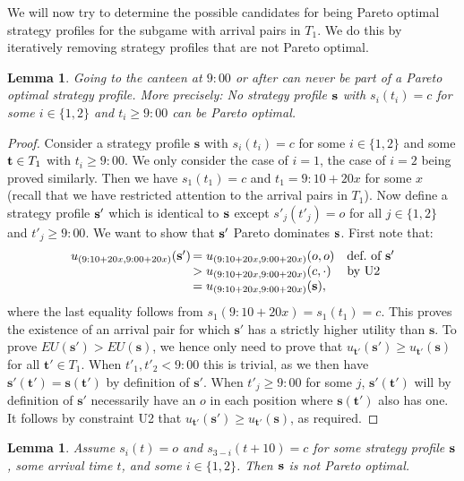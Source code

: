 \documentclass[twocolumn,a4paper,superscriptaddress,nofootinbib]{revtex4}
\newtheorem{lemma}[theorem]{Lemma}
\begin{document}
We will now try to determine the possible candidates for being Pareto optimal strategy profiles for the subgame with arrival pairs in $T_1$. We do this by iteratively removing strategy profiles that are not Pareto optimal.
\begin{lemma}\label{lemma:no-canteen-at-nine}
Going to the canteen at $9{:}00$ or after can never be part of a Pareto optimal strategy profile. More precisely: No strategy profile $\bf s$ with $s_i(t_i) = c$ for some $i \in \{1,2\}$ and
$t_i \geq 9{:}00$  can be Pareto optimal.
\end{lemma}
\begin{proof}
Consider a strategy profile $\mathbf{s}$ with $s_{i}(t_{i}) = c$ for some $i\in \{1,2\}$ and
some ${\bf t} \in T_1$ with $t_{i} \geq 9{:}00$. We only consider the case of $i=1$, the case of $i=2$ being proved similarly. Then we have $s_1(t_1) =c$ and $t_1 = 9{:}10+20x$ for some $x$ (recall that we have restricted attention to the arrival pairs in $T_1$). Now define a strategy profile ${\bf s}'$ which is identical to ${\bf s}$ except $s'_j(t'_j) = o$ for all $j \in \{1,2\}$ and $t'_j \geq 9{:}00$. We want to show that ${\bf s}'$ Pareto dominates ${\bf s}$. First note that:
\[
  \begin{array}{rll}
   u_{(9{:}10+20x,9{:}00+20x)}({\bf s}') \!\!\!\!\!{ } &= u_{(9{:}10+20x,9{:}00+20x)}(o,o) &\text{def.\ of $\mathbf{s'}$} \\
   	&> u_{(9{:}10+20x,9{:}00+20x)}(c,\cdot) &\text{by U2} \\
	&= u_{(9{:}10+20x,9{:}00+20x)}({\bf s}), \\ 
  \end{array}
\]
where the last equality follows from $s_1(9{:}10+20x) = s_1(t_1) =  c$. This proves the existence of an arrival pair for which $\mathbf{s'}$ has a strictly higher utility than $\mathbf{s}$. To prove $EU(\mathbf{s'}) > EU(\mathbf{s})$, we hence only need to prove that $u_\mathbf{t'}(\mathbf{s'}) \geq u_\mathbf{t'}(\mathbf{s})$ for all $\mathbf{t'} \in T_1$. When $t'_1,t'_2 < 9{:}00$ this is trivial, as we then have $\mathbf{s'}(\mathbf{t'}) = \mathbf{s}(\mathbf{t'})$ by definition of $\mathbf{s'}$. When $t'_j \geq 9{:}00$ for some $j$, $\mathbf{s'}(\mathbf{t'})$ will by definition of $\mathbf{s'}$ necessarily have an $o$ in each position where $\mathbf{s}(\mathbf{t'})$ also has one. It follows by constraint U2 that $u_\mathbf{t'}( \mathbf{s'}) \geq u_\mathbf{t'}( \mathbf{s})$, as required.
\end{proof}
\begin{lemma}\label{lemma:no-c-after-o}
Assume $s_i(t) = o$ and $s_{3-i}(t+10) = c$ for some strategy profile $\bf s$, some arrival time $t$, and some $i \in \{1,2\}$. Then $\bf s$ is not Pareto optimal.
\end{lemma}
\end{document}
